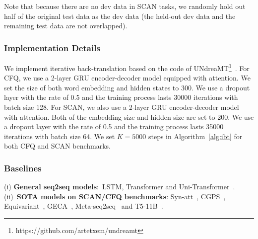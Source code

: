 \documentclass[letterpaper]{article} %
\begin{document}
Note that because there are no dev data in SCAN tasks, we randomly hold out half of the original test data as the dev data (the held-out dev data and the remaining test data are not overlapped).

\subsubsection{Implementation Details} We implement iterative back-translation based on the code of UNdreaMT\footnote{https://github.com/artetxem/undreamt}~\cite{artetxe2018iclr}. For CFQ, we use a 2-layer GRU encoder-decoder model equipped with attention. We set the size of both word embedding and hidden states to 300. We use a dropout layer with the rate of 0.5 and the training process lasts 30000 iterations with batch size 128. For SCAN, we also use a 2-layer GRU encoder-decoder model with attention. Both of the embedding size and hidden size are set to 200. We use a dropout layer with the rate of 0.5 and the training process lasts 35000 iterations with batch size 64. We set $K=5000$ steps in Algorithm~\ref{alg:ibt} for both CFQ and SCAN benchmarks.
\subsubsection{Baselines}
(i) \textbf{General seq2seq models}:~LSTM, Transformer and Uni-Transformer~\cite{keysers2020measuring}. (ii)~\textbf{SOTA models on SCAN/CFQ benchmarks}:  Syn-att~\cite{russin2019compositional}, CGPS~\cite{li2019compositional},  Equivariant~\cite{gordon2019permutation}, GECA~\cite{andreas-2020-good}, Meta-seq2seq~\cite{lake2019compositional} and T5-11B~\cite{furrer2020compositional}. 
\end{document}
